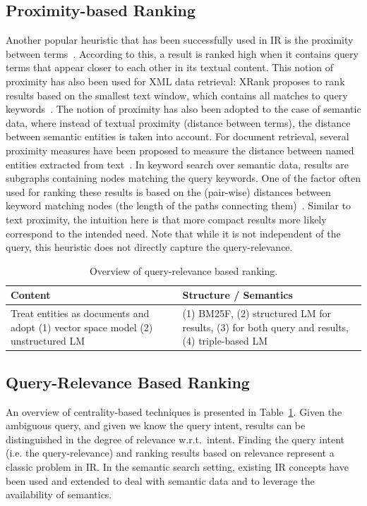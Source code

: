 \subsection{Proximity-based Ranking} Another popular heuristic that has been successfully used in IR is the proximity between terms~\cite{DBLP:conf/sigir/ButtcherCL06a,DBLP:conf/sigir/TaoZ07}. According to this, a result is ranked high when it contains query terms that appear closer to each other in its textual content. This notion of proximity has also been used for XML data retrieval: XRank proposes to rank results based on the smallest text window, which contains all matches to query keywords~\cite{DBLP:conf/sigmod/GuoSBS03}. The notion of proximity has also been adopted to the case of semantic data, where instead of textual proximity (distance between terms), the distance between semantic entities is taken into account. For document retrieval, several proximity measures have been proposed to measure the distance between named entities extracted from text~\cite{DBLP:conf/iiwas/LeCHC11}. In keyword search over semantic data, results are subgraphs containing nodes matching the query keywords. One of the factor often used for ranking these results is based on the (pair-wise) distances between keyword matching nodes (the length of the paths connecting them)~\cite{DBLP:conf/cikm/LadwigT11,DBLP:conf/icde/TranWRC09,DBLP:conf/sigmod/LiJLF09}. Similar to text proximity, the intuition here is that more compact results more likely correspond to the intended need. Note that while it is not independent of the query, this heuristic does not directly capture the query-relevance. 

\begin{table}[htbp]
  \centering
  \caption{Overview of query-relevance based ranking.}
    \begin{tabular}{|p{3.2cm}|p{3.8cm}|}
    \hline
    \textbf{Content} & \textbf{Structure} / \textbf{Semantics}  \bigstrut\\
    \hline
    \hline
    Treat entities as documents and adopt (1) vector space model (2) unstructured LM & (1) BM25F, (2) structured LM for results, (3) for both query and results, (4) triple-based LM \bigstrut\\
    \hline
    \end{tabular}%
  \label{tab:queryrelevance}%
\end{table}%


\subsection{Query-Relevance Based Ranking} An overview of centrality-based techniques is presented in Table~\ref{tab:queryrelevance}. Given the ambiguous query, and given we know the query intent, results can be distinguished in the degree of relevance w.r.t.~intent. Finding the query intent (i.e. the query-relevance) and ranking results based on relevance represent a classic problem in IR. In the semantic search setting, existing IR concepts have been used and extended to deal with semantic data and to leverage the availability of semantics. 

